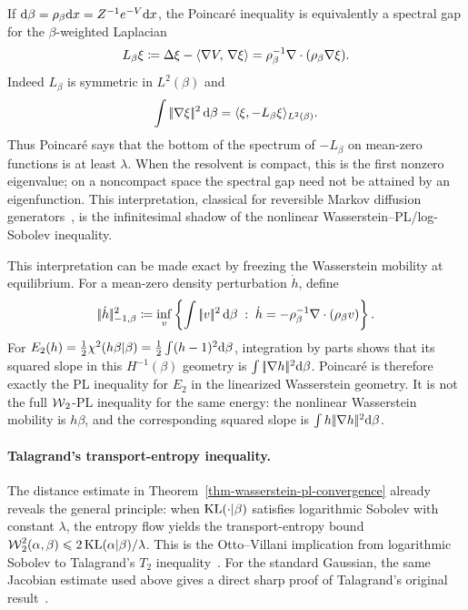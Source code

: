 If \(\mathrm{d}\beta=\rho_\beta\mathrm{d} x=Z^{-1}e^{-V}\mathrm{d} x\), the Poincar\'e inequality is equivalently a spectral gap for the \(\beta\)-weighted Laplacian
\[
	L_\beta\xi
	\coloneqq
	\Delta\xi-\langle \nabla V,\,\nabla\xi\rangle
	=
	\rho_\beta^{-1}\nabla\cdot(\rho_\beta\nabla\xi).
\]
Indeed \(L_\beta\) is symmetric in \(L^2(\beta)\) and
\[
	\int|\!| \nabla\xi |\!|^2\,\mathrm{d}\beta
	=
	\langle \xi,-L_\beta\xi\rangle_{L^2(\beta)}.
\]
Thus Poincar\'e says that the bottom of the spectrum of \(-L_\beta\) on mean-zero functions is at least \(\lambda\). When the resolvent is compact, this is the first nonzero eigenvalue; on a noncompact space the spectral gap need not be attained by an eigenfunction. This interpretation, classical for reversible Markov diffusion generators~\cite{Ledoux2001Concentration,BakryGentilLedoux2014Markov}, is the infinitesimal shadow of the nonlinear Wasserstein--PL/log-Sobolev inequality.

This interpretation can be made exact by freezing the Wasserstein mobility at equilibrium. For a mean-zero density perturbation \(\dot h\), define
\[
	|\!| \dot h |\!|_{-1,\beta}^2
	\coloneqq
	\inf_{v}
	\left\{
		\int|\!| v |\!|^2\,\mathrm{d}\beta
		\;:\;
		\dot h=-\rho_\beta^{-1}\nabla\cdot(\rho_\beta v)
	\right\}.
\]
For \(E_2(h)=\frac12\chi^2(h\beta|\beta)=\frac12\int(h-1)^2\mathrm{d}\beta\), integration by parts shows that its squared slope in this \(H^{-1}(\beta)\) geometry is \(\int|\!| \nabla h |\!|^2\mathrm{d}\beta\). Poincar\'e is therefore exactly the PL inequality for \(E_2\) in the linearized Wasserstein geometry. It is not the full \(\operatorname{\mathcal{W}}_2\)-PL inequality for the same energy: the nonlinear Wasserstein mobility is \(h\beta\), and the corresponding squared slope is \(\int h|\!| \nabla h |\!|^2\mathrm{d}\beta\).

\paragraph{Talagrand's transport-entropy inequality.}
The distance estimate in Theorem~\ref{thm-wasserstein-pl-convergence} already reveals the general principle: when \(\operatorname{KL}(\cdot|\beta)\) satisfies logarithmic Sobolev with constant \(\lambda\), the entropy flow yields the transport-entropy bound \(\operatorname{\mathcal{W}}_2^2(\alpha,\beta)\leqslant2\operatorname{KL}(\alpha|\beta)/\lambda\). This is the Otto--Villani implication from logarithmic Sobolev to Talagrand's \(T_2\) inequality~\cite{OttoVillani2000Generalization}. For the standard Gaussian, the same Jacobian estimate used above gives a direct sharp proof of Talagrand's original result~\cite{Talagrand1996Transport,CorderoErausquin2002GaussianMassTransport,Villani09}.

